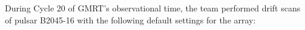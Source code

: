 \documentclass[a4paper,12pt]{article}
\begin{document}
                                                                                                                                                                                                                                                                                                                                                                                                                                                                                                                                                                                                                                                                                                                                                                                                                                                                                                                                                                                                                                                                                                                                                                                                                                                                                                                                                                                                                                                                                                                                                                                                                                                                                                                                                                                                                                                                                                                                                                                                                                                                                                                                                                                                                                                                                         During Cycle 20 of GMRT's observational time, the team performed drift scans of pulsar B2045-16 with the following default settings for the array:
\end{document}

